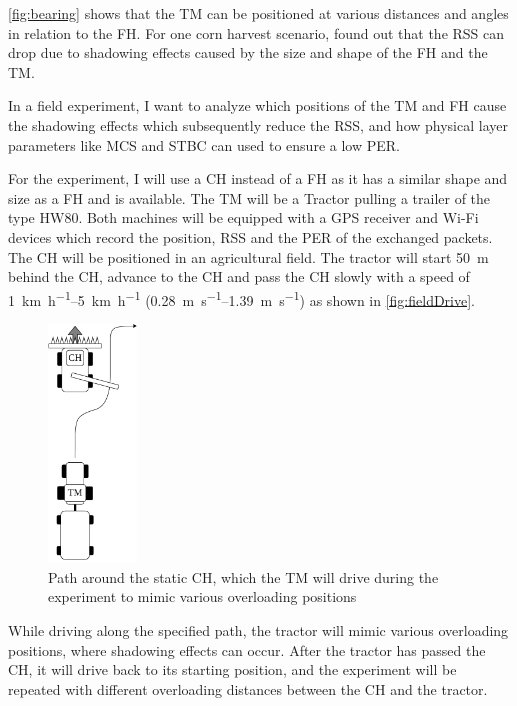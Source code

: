 \autoref{fig:bearing} shows that the \ac{TM} can be positioned at various distances and angles in relation to the \ac{FH}.
For one corn harvest scenario, \textcite{klingler_agriculture_2018} found out that the \ac{RSS} can drop due to
shadowing effects caused by the size and shape of the \ac{FH} and the \ac{TM}.

In a field experiment, I want to analyze which positions of the \ac{TM} and \ac{FH} cause the shadowing effects which
subsequently reduce the \ac{RSS}, and how physical layer parameters like \ac{MCS} and \ac{STBC} can used to ensure a low
\ac{PER}.

For the experiment, I will use a \ac{CH} instead of a \ac{FH} as it has a similar shape and size as a \ac{FH} and is available.
The \ac{TM} will be a Tractor pulling a trailer of the type HW80.
Both machines will be equipped with a \ac{GPS} receiver and Wi-Fi devices which record the position, \ac{RSS} and the \ac{PER} of the
exchanged packets.
The \ac{CH} will be positioned in an agricultural field.
The tractor will start \SI{50}{\metre} behind the \ac{CH}, advance to the \ac{CH} and pass the \ac{CH} slowly with a
speed of \SIrange{1}{5}{\kilo\metre\per\hour} (\SIrange{0.28}{1.39}{\metre\per\second}) as shown in \autoref{fig:fieldDrive}.
\begin{figure}[]%
	\centering
	\includegraphics[width=0.21\textwidth]{Latex/figures/FieldExperimentDrive}
	\caption{Path around the static \acf{CH}, which the \acf{TM} will drive during the experiment to mimic various overloading positions}%
	\label{fig:fieldDrive}
\end{figure}

While driving along the specified path, the tractor will mimic various overloading positions, where shadowing effects can occur. After the tractor has passed the \ac{CH},
it will drive back to its starting position, and the experiment will be repeated with different overloading distances between the \ac{CH} and the tractor.

